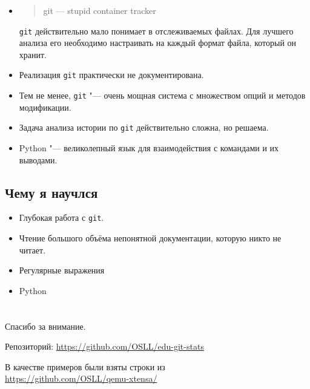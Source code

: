 \documentclass{beamer}
\makeatletter
\newcommand*{\currentname}{\@currentlabelname}
\def\t{\texttt}
\makeatother
\begin{document}
\begin{frame}[t]{\currentname}
	\pause
	\begin{itemize}
	\item
		\begin{quote}
			git --- stupid container tracker
		\end{quote}
		\t{git} действительно мало понимает в отслеживаемых файлах.
		Для лучшего анализа его необходимо настраивать на каждый формат файла, который он хранит.
		\pause
	\item
		Реализация \t{git} практически не документирована.
		\pause
	\item
		Тем не менее, \t{git} "--- очень мощная система с множеством опций и методов модификации.
		\pause
	\item
		Задача анализа истории по \t{git} действительно сложна, но решаема.
		\pause
	\item
		Python "--- великолепный язык для взаимодействия с командами и их выводами.
	\end{itemize}
\end{frame}

\subsection{Чему я научлся}

\begin{frame}[t]{\currentname}
	\pause
	\begin{itemize}
	\item
		Глубокая работа с \t{git}.
		\pause
	\item
		Чтение большого объёма непонятной документации, которую никто не читает.
		\pause
	\item
		Регулярные выражения
		\pause
	\item
		Python
	\end{itemize}
\end{frame}

\section{}

\begin{frame}
	\begin{center}
		Спасибо за внимание.

		\bigskip
		Репозиторий: \url{https://github.com/OSLL/edu-git-stats}

		\bigskip
		{\footnotesize
		В качестве примеров были взяты строки из \\
		\url{https://github.com/OSLL/qemu-xtensa/}

		}
	\end{center}
\end{frame}
\end{document}
